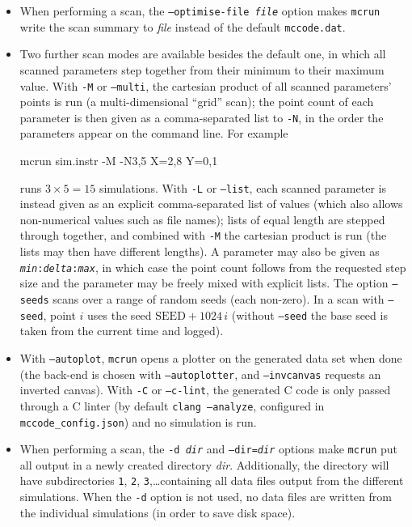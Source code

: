 \begin{itemize}
After running the simulation, the results will be written to the file
\verb+mccode.dat+ by default (see the \verb+--optimise-file+ option). This
file contains one line for each simulation
run giving the values of the scanned input variables along with the integrated
intensity and estimated error in all monitors. This file can be plotted with
any of the \verb+mcplot+ backends, see section~\ref{s:mcplot}.
\item When performing a scan, the \texttt{--optimise-file \textit{file}}
  option makes \verb+mcrun+ write the scan summary to \textit{file}
  instead of the default \verb+mccode.dat+.
\item Two further scan modes are available besides the default one, in which
  all scanned parameters step together from their minimum to their maximum
  value. With \texttt{-M} or \texttt{--multi}, the cartesian product of all
  scanned parameters' points is run (a multi-dimensional ``grid'' scan); the
  point count of each parameter is then given as a comma-separated list to
  \texttt{-N}, in the order the parameters appear on the command line. For
  example
\begin{bash}
mcrun sim.instr -M -N3,5 X=2,8 Y=0,1
\end{bash}
  runs $3\times5=15$ simulations. With \texttt{-L} or \texttt{--list}, each
  scanned parameter is instead given as an explicit comma-separated list of
  values (which also allows non-numerical values such as file names); lists
  of equal length are stepped through together, and combined with \texttt{-M}
  the cartesian product is run (the lists may then have different lengths).
  A parameter may also be given as \texttt{\textit{min}:\textit{delta}:\textit{max}},
  in which case the point count follows from the requested step size and the
  parameter may be freely mixed with explicit lists. The option
  \texttt{--seeds} scans over a range of random seeds (each non-zero). In a scan with
  \texttt{--seed}, point $i$ uses the seed $\mathrm{SEED}+1024\,i$ (without \texttt{--seed} the base seed is taken from the
  current time and logged).
\item With \texttt{--autoplot}, \verb+mcrun+ opens a plotter on the generated
  data set when done (the back-end is chosen with \texttt{--autoplotter}, and
  \texttt{--invcanvas} requests an inverted canvas). With
  \texttt{-C} or \texttt{--c-lint}, the generated C code is only passed
  through a C linter (by default \texttt{clang --analyze}, configured in
  \texttt{mccode\_config.json}) and no simulation is run.
\item When performing a scan, the \texttt{-d \textit{dir}} and
  \texttt{--dir=\textit{dir}} options make \verb+mcrun+ put all output in a
  newly created directory \textit{dir}. Additionally, the directory will
  have subdirectories \verb+1+, \verb+2+, \verb+3+,\ldots containing all
  data files output from the different simulations. When the \verb+-d+
  option is not used, no data files are written from the individual
  simulations (in order to save disk space).
\end{itemize}


